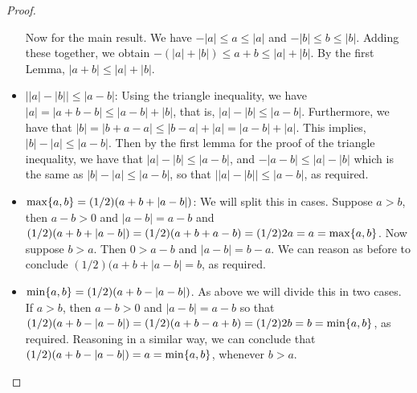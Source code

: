 \begin{proof}
\begin{itemize}
     Now for the main result. We have $-\lvert a\rvert\leq a\leq\lvert a\rvert$ and $-\lvert b\rvert\leq b\leq\lvert b\rvert$. Adding these together, we obtain $-(\lvert a\rvert+\lvert b\rvert)\leq a+b\leq\lvert a\rvert+\lvert b\rvert$. By the first Lemma, $\lvert a+b\rvert\leq\lvert a\rvert +\lvert b\rvert$.
     \item $\lvert\lvert a\rvert -\lvert b\rvert\rvert \leq\lvert a-b\rvert$: Using the triangle inequality, we have $\lvert a\rvert = \lvert a+b-b\rvert \leq \lvert a-b\rvert +\lvert b\rvert$, that is, $\lvert a\rvert-\lvert b\rvert\leq \lvert a-b\rvert$. Furthermore, we have that $\lvert b\rvert =\lvert b+a-a\lvert \leq\lvert b-a\rvert+\lvert a\rvert =\lvert a-b\rvert +\lvert a\rvert$. This implies, $\lvert b\rvert -\lvert a\rvert \leq\lvert a-b\rvert$. Then by the first lemma for the proof of the triangle inequality, we have that $\lvert a\rvert -\lvert b\rvert\leq \lvert a-b\rvert$, and $-\lvert a-b\rvert\leq\lvert a\rvert -\lvert b\rvert$ which is the same as $\lvert b\rvert-\lvert a\rvert\leq\lvert a-b\rvert$, so that $\lvert \lvert a\rvert -\lvert b\rvert \rvert \leq \lvert a-b\rvert$, as required.
     \item $\max\{a,b \}=(1/2)(a+b+\lvert a-b\rvert)$: We will split this in cases. Suppose $a>b$, then $a-b>0$ and $\lvert a-b\rvert =a-b$ and $(1/2)(a+b+\lvert a-b\rvert) =(1/2)(a+b+a-b) =(1/2)2a =a =\max\{a,b\}$. Now suppose $b>a$. Then $0>a-b$ and $\lvert a-b\rvert = b-a$. We can reason as before to conclude $(1/2)(a+b+\lvert a-b\rvert =b$, as required.
     \item $\min\{a,b\}=(1/2)(a+b-\lvert a-b\rvert)$. As above we will divide this in two cases. If $a>b$, then $a-b>0$ and $\lvert a-b\rvert =a-b$ so that $(1/2)(a+b-\lvert a-b\rvert) =(1/2)(a+b-a+b) =(1/2)2b =b =\min\{a,b\}$, as required. Reasoning in a similar way, we can conclude that $(1/2)(a+b-\lvert  a-b\rvert) =a =\min\{a,b\}$, whenever $b>a$.
\end{itemize}
\end{proof}

